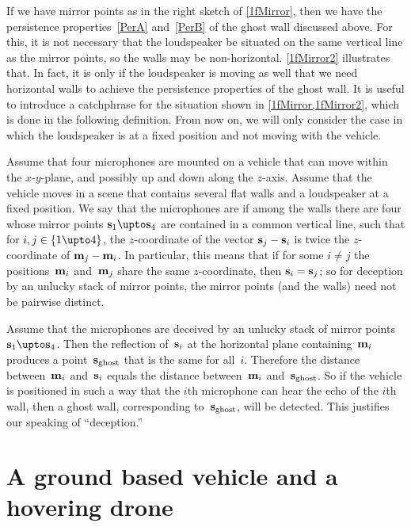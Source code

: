 \documentclass[reqno]{amsart}
\begin{document}
If we have mirror points as in the right sketch of \cref{1fMirror}, then we have the persistence
properties~\ref{PerA} and~\ref{PerB} of the ghost wall discussed above. For this, it is not
necessary that the loudspeaker be situated on the same vertical line
as the mirror points, so the walls may be non-horizontal. \cref{1fMirror2} illustrates that. In fact, it
is only if the loudspeaker is moving as well that we need horizontal
walls to achieve the persistence properties of the ghost wall. It is useful to introduce a catchphrase for the situation shown in \cref{1fMirror,1fMirror2}, which is done in the following definition. From now on, we will only consider the case in which the loudspeaker is at a fixed position and not moving with the vehicle.

\begin{defi} \label{Stack}%
  Assume that four microphones are mounted on a vehicle that can move
  within the $x$-$y$-plane, and possibly up and down along the
  $z$-axis. Assume that the vehicle moves in a scene that contains
  several flat walls and a loudspeaker at a fixed position. We say that the microphones are
   if among the walls there are four whose
  mirror points $\ve s_1 \upto \ve s_4$ are contained in a common
  vertical line, such that for $i,j \in \{1 \upto 4\}$, the $z$-coordinate of
  the vector $\mathbf{s}_j - \mathbf{s}_i$ is twice the $z$-coordinate of
  $\mathbf{m}_j - \mathbf{m}_i$. In particular, this means that if for some $i \ne j$
  the positions~$\mathbf{m}_i$ and~$\mathbf{m}_j$ share the same $z$-coordinate, then $\mathbf{s}_i = \mathbf{s}_j$; so for deception by an unlucky stack of mirror points, the mirror points (and the walls) need not be pairwise distinct.
\end{defi}

Assume that the microphones are deceived by an unlucky stack of mirror points $\ve s_1 \upto \ve s_4$. Then the reflection of~$\mathbf{s}_i$ at the horizontal plane containing~$\mathbf{m}_i$ produces a point~$\mathbf{s}_{\operatorname{ghost}}$ that is the same for all~$i$. Therefore the distance between~$\mathbf{m}_i$ and~$\mathbf{s}_i$ equals the distance between~$\mathbf{m}_i$ and~$\mathbf{s}_{\operatorname{ghost}}$. So if the vehicle is positioned in such a way that the $i$th microphone can hear the echo of the $i$th wall, then a ghost wall, corresponding to~$\mathbf{s}_{\operatorname{ghost}}$, will be detected. This justifies our speaking of ``deception.''

\section{A ground based vehicle and a hovering drone} \label{sMain}
\end{document}
